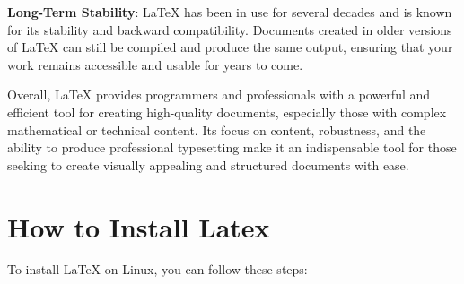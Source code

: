 \documentclass[12pt]{article}
\begin{document}
	\textbf{Long-Term Stability}: LaTeX has been in use for several decades and is known for its stability and backward compatibility. Documents created in older versions of LaTeX can still be compiled and produce the same output, ensuring that your work remains accessible and usable for years to come.
	
	Overall, LaTeX provides programmers and professionals with a powerful and efficient tool for creating high-quality documents, especially those with complex mathematical or technical content. Its focus on content, robustness, and the ability to produce professional typesetting make it an indispensable tool for those seeking to create visually appealing and structured documents with ease.
	
	
	
	
	
	
	
	\section{How to Install Latex}
	
	To install LaTeX on Linux, you can follow these steps:
	
\end{document}
